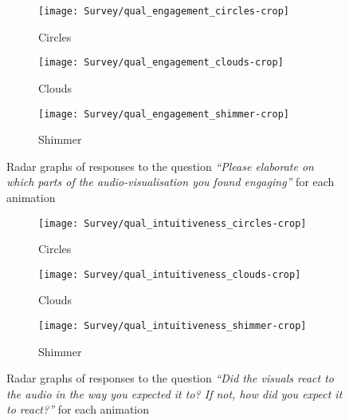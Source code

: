 \documentclass[../initial_thesis.tex]{subfiles}
\begin{document}
\begin{figure}
  \begin{subfigure}{0.32\textwidth}
    \centering
    \texttt{[image: Survey/qual\_engagement\_circles-crop]}
    \caption{Circles}
    \label{fig:engagement_circles}
  \end{subfigure}
  \begin{subfigure}{0.32\textwidth}
    \centering
    \texttt{[image: Survey/qual\_engagement\_clouds-crop]}
    \caption{Clouds}
    \label{fig:engagement_clouds}
  \end{subfigure}
  \begin{subfigure}{0.32\textwidth}
    \centering
    \texttt{[image: Survey/qual\_engagement\_shimmer-crop]}
    \caption{Shimmer}
    \label{fig:engagement_shimmer}
  \end{subfigure}
  \caption{Radar graphs of responses to the question \textit{``Please elaborate on which parts of the audio-visualisation you found engaging''} for each animation}
  \label{fig:engagement_radar}
\end{figure}

\begin{figure}
  \begin{subfigure}{0.32\textwidth}
    \centering
    \texttt{[image: Survey/qual\_intuitiveness\_circles-crop]}
    \caption{Circles}
    \label{fig:intuitiveness_circles}
  \end{subfigure}
  \begin{subfigure}{0.32\textwidth}
    \centering
    \texttt{[image: Survey/qual\_intuitiveness\_clouds-crop]}
    \caption{Clouds}
    \label{fig:intuitiveness_clouds}
  \end{subfigure}
  \begin{subfigure}{0.32\textwidth}
    \centering
    \texttt{[image: Survey/qual\_intuitiveness\_shimmer-crop]}
    \caption{Shimmer}
    \label{fig:intuitiveness_shimmer}
  \end{subfigure}
  \caption{Radar graphs of responses to the question \textit{``Did the visuals react to the audio in the way you expected it to? If not, how did you expect it to react?''} for each animation}
  \label{fig:intuitiveness_radar}
\end{figure}
\end{document}
